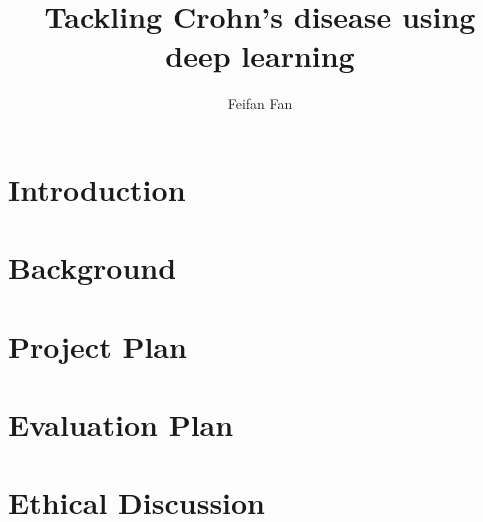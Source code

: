 \documentclass[a4paper,12pt,twoside]{report}
\begin{document}
\title{Tackling Crohn's disease using deep learning}
\author{Feifan Fan}


% 
% 

\tableofcontents

\chapter{Introduction}
\label{cha:introduction}


\chapter{Background}
\label{cha:background}


\chapter{Project Plan}
\label{cha:project-plan}


\chapter{Evaluation Plan} %
\label{cha:evaluation-plan}

\chapter{Ethical Discussion}
\label{cha:ethical-discussion}


% 

% 

% 


\end{document}
